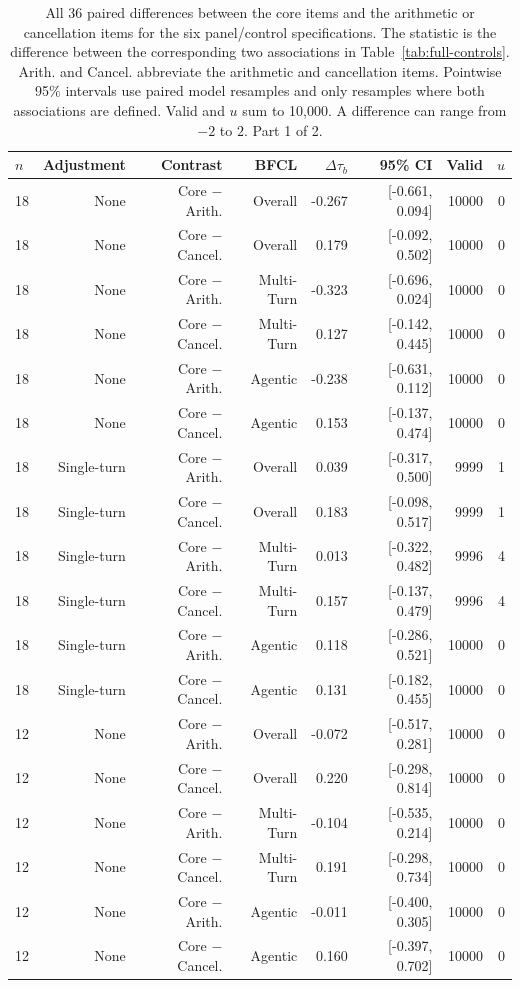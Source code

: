 \begin{table}[t]
\centering
\footnotesize
\setlength{\tabcolsep}{3pt}
\begin{tabular}{lrrrrrrr}
\toprule
$n$ & Adjustment & Contrast & BFCL & $\Delta\tau_b$ & 95\% CI & Valid & $u$ \\
\midrule
18 & None & Core $-$ Arith. & Overall & -0.267 & [-0.661, 0.094] & 10000 & 0 \\
18 & None & Core $-$ Cancel. & Overall & 0.179 & [-0.092, 0.502] & 10000 & 0 \\
18 & None & Core $-$ Arith. & Multi-Turn & -0.323 & [-0.696, 0.024] & 10000 & 0 \\
18 & None & Core $-$ Cancel. & Multi-Turn & 0.127 & [-0.142, 0.445] & 10000 & 0 \\
18 & None & Core $-$ Arith. & Agentic & -0.238 & [-0.631, 0.112] & 10000 & 0 \\
18 & None & Core $-$ Cancel. & Agentic & 0.153 & [-0.137, 0.474] & 10000 & 0 \\
18 & Single-turn & Core $-$ Arith. & Overall & 0.039 & [-0.317, 0.500] & 9999 & 1 \\
18 & Single-turn & Core $-$ Cancel. & Overall & 0.183 & [-0.098, 0.517] & 9999 & 1 \\
18 & Single-turn & Core $-$ Arith. & Multi-Turn & 0.013 & [-0.322, 0.482] & 9996 & 4 \\
18 & Single-turn & Core $-$ Cancel. & Multi-Turn & 0.157 & [-0.137, 0.479] & 9996 & 4 \\
18 & Single-turn & Core $-$ Arith. & Agentic & 0.118 & [-0.286, 0.521] & 10000 & 0 \\
18 & Single-turn & Core $-$ Cancel. & Agentic & 0.131 & [-0.182, 0.455] & 10000 & 0 \\
12 & None & Core $-$ Arith. & Overall & -0.072 & [-0.517, 0.281] & 10000 & 0 \\
12 & None & Core $-$ Cancel. & Overall & 0.220 & [-0.298, 0.814] & 10000 & 0 \\
12 & None & Core $-$ Arith. & Multi-Turn & -0.104 & [-0.535, 0.214] & 10000 & 0 \\
12 & None & Core $-$ Cancel. & Multi-Turn & 0.191 & [-0.298, 0.734] & 10000 & 0 \\
12 & None & Core $-$ Arith. & Agentic & -0.011 & [-0.400, 0.305] & 10000 & 0 \\
12 & None & Core $-$ Cancel. & Agentic & 0.160 & [-0.397, 0.702] & 10000 & 0 \\
\bottomrule
\end{tabular}
\caption{All 36 paired differences between the core items and the arithmetic or cancellation items for the six panel/control specifications. The statistic is the difference between the corresponding two associations in Table~\ref{tab:full-controls}. Arith. and Cancel. abbreviate the arithmetic and cancellation items. Pointwise 95\% intervals use paired model resamples and only resamples where both associations are defined. Valid and $u$ sum to 10,000. A difference can range from $-2$ to $2$. Part 1 of 2.}
\label{tab:full-control-differences}
\end{table}
